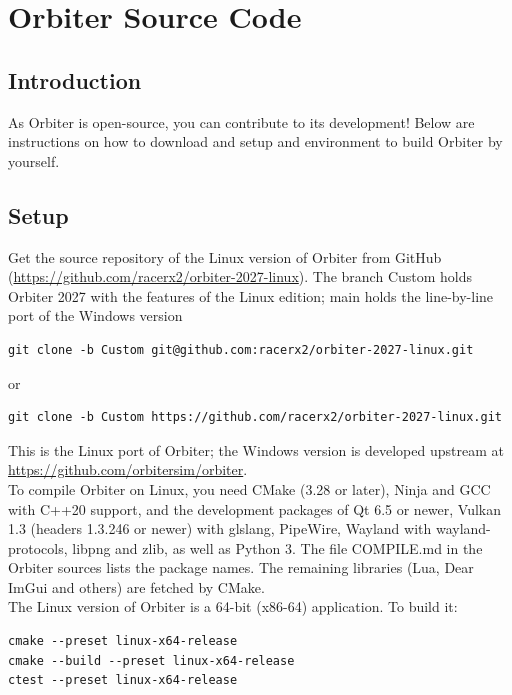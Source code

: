 \documentclass[Orbiter Developer Manual.tex]{subfiles}
\begin{document}
\section{Orbiter Source Code}

\subsection{Introduction}
As Orbiter is open-source, you can contribute to its development!
Below are instructions on how to download and setup and environment to build Orbiter by yourself.


\subsection{Setup}
Get the source repository of the Linux version of Orbiter from GitHub (\url{https://github.com/racerx2/orbiter-2027-linux}). The branch Custom holds Orbiter 2027 with the features of the Linux edition; main holds the line-by-line port of the Windows version

\begin{lstlisting}
git clone -b Custom git@github.com:racerx2/orbiter-2027-linux.git
\end{lstlisting}

\noindent
or

\begin{lstlisting}
git clone -b Custom https://github.com/racerx2/orbiter-2027-linux.git
\end{lstlisting}

\noindent
This is the Linux port of Orbiter; the Windows version is developed upstream at \url{https://github.com/orbitersim/orbiter}.\\
To compile Orbiter on Linux, you need CMake (3.28 or later), Ninja and GCC with C++20 support, and the development packages of Qt 6.5 or newer, Vulkan 1.3 (headers 1.3.246 or newer) with glslang, PipeWire, Wayland with wayland-protocols, libpng and zlib, as well as Python 3. The file COMPILE.md in the Orbiter sources lists the package names. The remaining libraries (Lua, Dear ImGui and others) are fetched by CMake.\\
The Linux version of Orbiter is a 64-bit (x86-64) application. To build it:

\begin{lstlisting}
cmake --preset linux-x64-release
cmake --build --preset linux-x64-release
ctest --preset linux-x64-release
\end{lstlisting}
\end{document}
